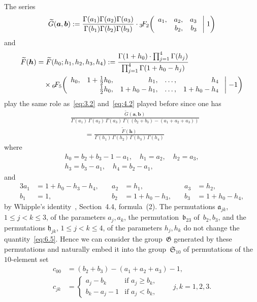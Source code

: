\documentclass[a4paper,twoside]{article}
\numberwithin{equation}{section}
\renewcommand{\[}{\lfloor}
\renewcommand{\]}{\rfloor}
\newcommand{\<}{\langle}
\renewcommand{\>}{\rangle}
\newcommand{\wt}{\widetilde}
\newcommand{\ba}{\boldsymbol a}
\newcommand{\bb}{\boldsymbol b}
\newcommand{\bh}{\boldsymbol h}
\newcommand{\fa}{\mathfrak a}
\newcommand{\fb}{\mathfrak b}
\newcommand{\fh}{\mathfrak h}
\newcommand{\fS}{\mathfrak S}
\newcommand{\fG}{\mathfrak G}
\begin{document}
The series
$$
\wt G(\ba,\bb)
:=\frac{\Gamma(a_1)\Gamma(a_2)\Gamma(a_3)}
{\Gamma(b_1)\Gamma(b_2)\Gamma(b_3)}
\cdot{}_3\!F_2\biggl(\begin{array}{rrr}
a_1, & a_2, & a_3 \\
     & b_2, & b_3
\end{array}\biggm|1\biggr)
$$
and
\begin{align*}
\wt F(\bh)
&=\wt F(h_0;h_1,h_2,h_3,h_4)
:=\frac{\Gamma(1+h_0)\cdot\prod_{j=1}^4\Gamma(h_j)}
{\prod_{j=1}^4\Gamma(1+h_0-h_j)}
\\ &\quad\times
{}_6\!F_5\biggl(\begin{array}{rrrrr}
h_0, & 1+\frac12h_0, &       h_1, & \dots, &       h_4 \\[1pt]
     &   \frac12h_0, & 1+h_0-h_1, & \dots, & 1+h_0-h_4
\end{array}\biggm|-1\biggr)
\end{align*}
play the same role as~\eqref{eq:3.2} and~\eqref{eq:4.2} played before
since one has
\begin{align}
&
\frac{\wt G(\ba,\bb)}
{\Gamma(a_1)\,\Gamma(a_2)\,\Gamma(a_3)\,\Gamma((b_2+b_3)-(a_1+a_2+a_3))}
\nonumber\\ &\qquad
=\frac{\wt F(\bh)}
{\Gamma(h_1)\,\Gamma(h_2)\,\Gamma(h_3)\,\Gamma(h_4)}
\label{eq:6.5}
\end{align}
where
$$
\begin{gathered}
h_0=b_2+b_3-1-a_1, \quad h_1=a_2, \quad h_2=a_3,
\\
h_3=b_3-a_1, \quad h_4=b_2-a_1,
\end{gathered}
$$
and
$$
\begin{alignedat}{3}{3}
a_1&=1+h_0-h_3-h_4, \quad& a_2&=h_1, \quad& a_3&=h_2,
\\
b_1&=1, \quad& b_2&=1+h_0-h_3, \quad& b_3&=1+h_0-h_4,
\end{alignedat}
$$
by Whipple's identity~\cite{Ba3}, Section~4.4, formula~(2).
The permutations $\fa_{jk}$, $1\le j<k\le3$, of the parameters $a_j,a_k$,
the permutation~$\fb_{23}$ of~$b_2,b_3$, and the permutations
$\fh_{jk}$, $1\le j<k\le4$, of the parameters $h_j,h_k$
do not change the quantity~\eqref{eq:6.5}. Hence we can consider
the group~$\fG$ generated by these permutations and naturally embed it
into the group~$\fS_{10}$ of permutations of the $10$-element set
\begin{align*}
c_{00}&=(b_2+b_3)-(a_1+a_2+a_3)-1,
\\
c_{jk}&=\begin{cases}
a_j-b_k &\mbox{if $a_j\ge b_k$}, \\
b_k-a_j-1 &\mbox{if $a_j<b_k$},
\end{cases}
\qquad j,k=1,2,3.
\end{align*}
\end{document}
